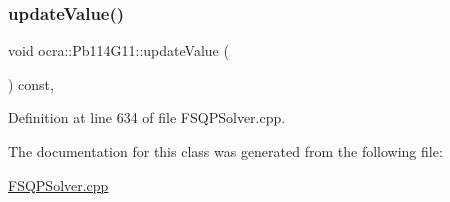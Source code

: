 \hypertarget{classocra_1_1Pb114G11_a21e66a9f60492d3c0ff7ed678d39de56}{}\label{classocra_1_1Pb114G11_a21e66a9f60492d3c0ff7ed678d39de56} 
\subsubsection{\texorpdfstring{update\+Value()}{updateValue()}}
{\footnotesize\ttfamily void ocra\+::\+Pb114\+G11\+::update\+Value (\begin{DoxyParamCaption}{ }\end{DoxyParamCaption}) const\hspace{0.3cm}{\ttfamily [inline]}, {\ttfamily [protected]}}



Definition at line 634 of file F\+S\+Q\+P\+Solver.\+cpp.



The documentation for this class was generated from the following file\+:\begin{DoxyCompactItemize}
\item 
\hyperlink{FSQPSolver_8cpp}{F\+S\+Q\+P\+Solver.\+cpp}\end{DoxyCompactItemize}
